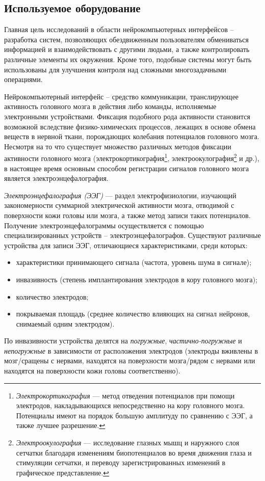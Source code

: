 \documentclass[12pt,a4paper,oneside,fleqn,leqno]{article}
\begin{document}
	\subsection{Используемое оборудование}\label{Emotiv_descr}
	\par Главная цель исследований в области нейрокомпьютерных интерфейсов -- разработка систем, позволяющих обездвиженным пользователям обмениваться информацией и взаимодействовать с другими людьми, а также контролировать различные элементы их окружения. Кроме того, подобные системы могут быть использованы для улучшения контроля над сложными многозадачными операциями.
	\par Нейрокомпьютерный интерфейс -- средство коммуникации, транслирующее активность головного мозга в действия либо команды, исполняемые электронными устройствами. Фиксация подобного рода активности становится возможной вследствие физико-химических процессов, лежащих в основе обмена веществ в нервной ткани, порождающих колебания потенциалов головного мозга. Несмотря на то что существует множество различных методов фиксации активности головного мозга (электрокортикография\footnote{{\it Электрокортикография} — метод отведения потенциалов при помощи электродов, накладывающихся непосредственно на кору головного мозга. Потенциалы имеют на порядок большую амплитуду по сравнению с ЭЭГ, а также лучшее разрешение.}, электроокулография\footnote{{\it Электроокулография} — исследование глазных мышц и наружного слоя сетчатки благодаря изменениям биопотенциалов во время движения глаза и стимуляции сетчатки, и переводу зарегистрированных изменений в графическое представление.} и др.), в настоящее время основным способом регистрации сигналов головного мозга является электроэнцефалография. 
	\par {\it Электроэнцефалография (ЭЭГ)} — раздел электрофизиологии, изучающий закономерности суммарной электрической активности мозга, отводимой с поверхности кожи головы или мозга, а также метод записи таких потенциалов. Получение электроэнцефалограммы осуществляется с помощью специализированных устройств -- электроэнцефалографов. Существуют различные устройства для записи ЭЭГ, отличающиеся характеристиками, среди которых: 
	\begin{itemize}\itemsep0pt
	\item
	характеристики принимающего сигнала (частота, уровень шума в сигнале);
	\item
	инвазивность (степень имплантирования электродов в кору головного мозга);
	\item
	количество электродов;
	\item
	покрываемая площадь (среднее количество влияющих на сигнал нейронов, снимаемый одним электродом).
	\end{itemize}
	\par По инвазивности устройства делятся на {\it погружные}, {\it частично-погружные} и {\it непогружные} в зависимости от расположения электродов (электроды вживлены в мозг/сращены с нервами, находятся на поверхности мозга/рядом с нервами или находятся на поверхности кожи головы соответственно).
\end{document}
